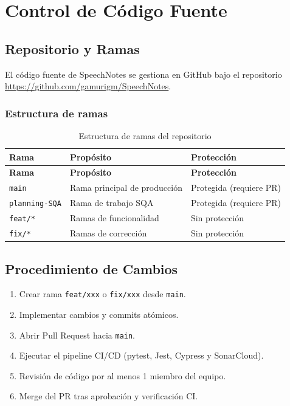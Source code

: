 \chapter{Control de Código Fuente}
\label{sec:control-codigo}

\section{Repositorio y Ramas}
\label{sec:repositorio}

El código fuente de SpeechNotes se gestiona en GitHub bajo el repositorio \url{https://github.com/gamurigm/SpeechNotes}.

\subsection{Estructura de ramas}
\label{subsec:ramas}

\begin{longtable}{lll}
\caption{Estructura de ramas del repositorio}
\label{tab:ramas}\\
\toprule
\textbf{Rama} & \textbf{Propósito} & \textbf{Protección}\\
\midrule
\endfirsthead
\toprule
\textbf{Rama} & \textbf{Propósito} & \textbf{Protección}\\
\midrule
\endhead
\bottomrule
\endfoot

\texttt{main} & Rama principal de producción & Protegida (requiere PR)\\

\texttt{planning-SQA} & Rama de trabajo SQA & Protegida (requiere PR)\\

\texttt{feat/*} & Ramas de funcionalidad & Sin protección\\

\texttt{fix/*} & Ramas de corrección & Sin protección\\

\end{longtable}

\section{Procedimiento de Cambios}
\label{sec:procedimiento-cambios}

\begin{enumerate}
    \item Crear rama \texttt{feat/xxx} o \texttt{fix/xxx} desde \texttt{main}.
    \item Implementar cambios y commits atómicos.
    \item Abrir Pull Request hacia \texttt{main}.
    \item Ejecutar el pipeline CI/CD (pytest, Jest, Cypress y SonarCloud).
    \item Revisión de código por al menos 1 miembro del equipo.
    \item Merge del PR tras aprobación y verificación CI.
\end{enumerate}

